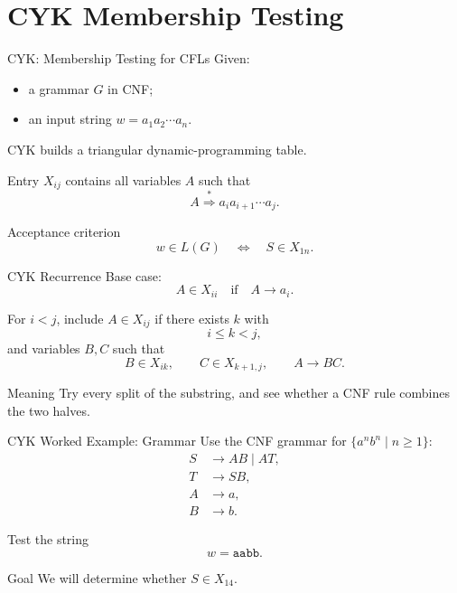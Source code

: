 \documentclass[aspectratio=169,10pt]{beamer}
\newcommand{\ders}{\overset{*}{\Rightarrow}}
\newcommand{\code}[1]{\texttt{#1}}
\begin{document}
\section{CYK Membership Testing}

\begin{frame}{CYK: Membership Testing for CFLs}
\small
Given:
\begin{itemize}
    \item a grammar \(G\) in CNF;
    \item an input string \(w=a_1a_2\cdots a_n\).
\end{itemize}

CYK builds a triangular dynamic-programming table.

\vspace{0.5em}
Entry \(X_{ij}\) contains all variables \(A\) such that
\[
A\ders a_i a_{i+1}\cdots a_j.
\]

\begin{alertblock}{Acceptance criterion}
\[
w\in L(G)\quad\Longleftrightarrow\quad S\in X_{1n}.
\]
\end{alertblock}
\end{frame}

\begin{frame}{CYK Recurrence}
\small
Base case:
\[
A\in X_{ii}
\quad\text{if}\quad
A\to a_i.
\]

For \(i<j\), include \(A\in X_{ij}\) if there exists \(k\) with
\[
i\le k<j,
\]
and variables \(B,C\) such that
\[
B\in X_{ik},
\qquad
C\in X_{k+1,j},
\qquad
A\to BC.
\]

\begin{exampleblock}{Meaning}
Try every split of the substring, and see whether a CNF rule combines the two halves.
\end{exampleblock}
\end{frame}

\begin{frame}{CYK Worked Example: Grammar}
\small
Use the CNF grammar for \(\{a^n b^n\mid n\ge1\}\):
\[
\begin{aligned}
S&\to AB\mid AT,\\
T&\to SB,\\
A&\to a,\\
B&\to b.
\end{aligned}
\]

Test the string
\[
w=\code{aabb}.
\]

\begin{block}{Goal}
We will determine whether \(S\in X_{14}\).
\end{block}
\end{frame}
\end{document}
